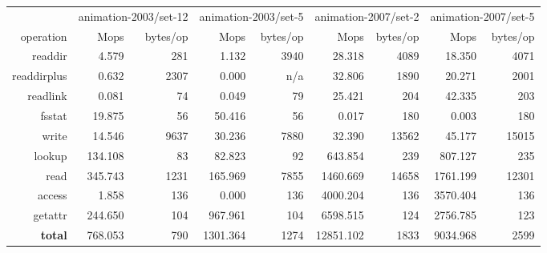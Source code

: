 \begin{table*}
\begin{tabular}{|r||r|r||r|r||r|r||r|r|}
\hline
  & \multicolumn{2}{c||}{animation-2003/set-12} & \multicolumn{2}{c||}{animation-2003/set-5} & \multicolumn{2}{c||}{animation-2007/set-2} & \multicolumn{2}{c|}{animation-2007/set-5} \\
   operation &   Mops & bytes/op &   Mops & bytes/op &   Mops & bytes/op &   Mops & bytes/op \\
\hline
     readdir &     4.579 &   281 &     1.132 &  3940 &    28.318 &  4089 &    18.350 &  4071 \\
 readdirplus &     0.632 &  2307 &     0.000 &  n/a  &    32.806 &  1890 &    20.271 &  2001 \\
    readlink &     0.081 &    74 &     0.049 &    79 &    25.421 &   204 &    42.335 &   203 \\
      fsstat &    19.875 &    56 &    50.416 &    56 &     0.017 &   180 &     0.003 &   180 \\
       write &    14.546 &  9637 &    30.236 &  7880 &    32.390 & 13562 &    45.177 & 15015 \\
\hline
      lookup &   134.108 &    83 &    82.823 &    92 &   643.854 &   239 &   807.127 &   235 \\
        read &   345.743 &  1231 &   165.969 &  7855 &  1460.669 & 14658 &  1761.199 & 12301 \\
      access &     1.858 &   136 &     0.000 &   136 &  4000.204 &   136 &  3570.404 &   136 \\
     getattr &   244.650 &   104 &   967.961 &   104 &  6598.515 &   124 &  2756.785 &   123 \\
\hline
 {\bf total} &   768.053 &   790 &  1301.364 &  1274 & 12851.102 &  1833 &  9034.968 &  2599 \\
\hline
\end{tabular}


\end{table*}
